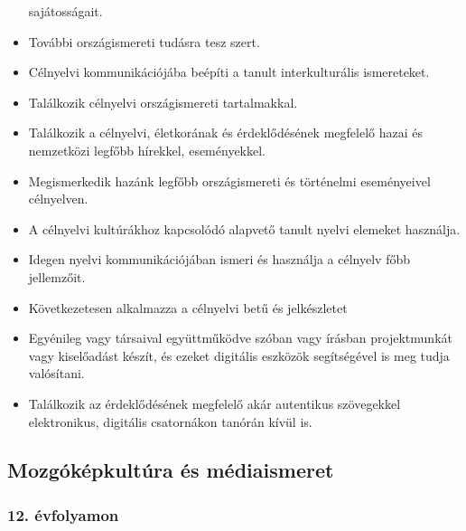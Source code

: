 \begin{itemize}
  sajátosságait.
\item
  További országismereti tudásra tesz szert.
\item
  Célnyelvi kommunikációjába beépíti a tanult interkulturális
  ismereteket.
\item
  Találkozik célnyelvi országismereti tartalmakkal.
\item
  Találkozik a célnyelvi, életkorának és érdeklődésének megfelelő hazai
  és nemzetközi legfőbb hírekkel, eseményekkel.
\item
  Megismerkedik hazánk legfőbb országismereti és történelmi eseményeivel
  célnyelven.
\item
  A célnyelvi kultúrákhoz kapcsolódó alapvető tanult nyelvi elemeket
  használja.
\item
  Idegen nyelvi kommunikációjában ismeri és használja a célnyelv főbb
  jellemzőit.
\item
  Következetesen alkalmazza a célnyelvi betű és jelkészletet
\item
  Egyénileg vagy társaival együttműködve szóban vagy írásban
  projektmunkát vagy kiselőadást készít, és ezeket digitális eszközök
  segítségével is meg tudja valósítani.
\item
  Találkozik az érdeklődésének megfelelő akár autentikus szövegekkel
  elektronikus, digitális csatornákon tanórán kívül is.
\end{itemize}

\hypertarget{mozgokepkultura-es-mediaismeret}{%
\subsection{Mozgóképkultúra és
médiaismeret}\label{mozgokepkultura-es-mediaismeret}}

\hypertarget{evfolyamon-28}{%
\subsubsection{12. évfolyamon}\label{evfolyamon-28}}

